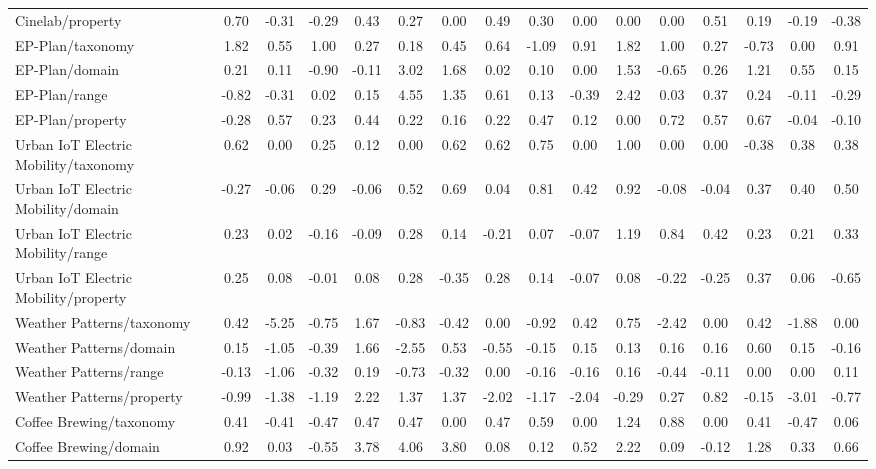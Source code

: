 \begin{tabular}{lccccccccccccccc}
Cinelab/property & 0.70 & -0.31 & -0.29 & 0.43 & 0.27 & 0.00 & 0.49 & 0.30 & 0.00 & 0.00 & 0.00 & 0.51 & 0.19 & -0.19 & -0.38 \\
EP-Plan/taxonomy & 1.82 & 0.55 & 1.00 & 0.27 & 0.18 & 0.45 & 0.64 & -1.09 & 0.91 & 1.82 & 1.00 & 0.27 & -0.73 & 0.00 & 0.91 \\
EP-Plan/domain & 0.21 & 0.11 & -0.90 & -0.11 & 3.02 & 1.68 & 0.02 & 0.10 & 0.00 & 1.53 & -0.65 & 0.26 & 1.21 & 0.55 & 0.15 \\
EP-Plan/range & -0.82 & -0.31 & 0.02 & 0.15 & 4.55 & 1.35 & 0.61 & 0.13 & -0.39 & 2.42 & 0.03 & 0.37 & 0.24 & -0.11 & -0.29 \\
EP-Plan/property & -0.28 & 0.57 & 0.23 & 0.44 & 0.22 & 0.16 & 0.22 & 0.47 & 0.12 & 0.00 & 0.72 & 0.57 & 0.67 & -0.04 & -0.10 \\
Urban IoT Electric Mobility/taxonomy & 0.62 & 0.00 & 0.25 & 0.12 & 0.00 & 0.62 & 0.62 & 0.75 & 0.00 & 1.00 & 0.00 & 0.00 & -0.38 & 0.38 & 0.38 \\
Urban IoT Electric Mobility/domain & -0.27 & -0.06 & 0.29 & -0.06 & 0.52 & 0.69 & 0.04 & 0.81 & 0.42 & 0.92 & -0.08 & -0.04 & 0.37 & 0.40 & 0.50 \\
Urban IoT Electric Mobility/range & 0.23 & 0.02 & -0.16 & -0.09 & 0.28 & 0.14 & -0.21 & 0.07 & -0.07 & 1.19 & 0.84 & 0.42 & 0.23 & 0.21 & 0.33 \\
Urban IoT Electric Mobility/property & 0.25 & 0.08 & -0.01 & 0.08 & 0.28 & -0.35 & 0.28 & 0.14 & -0.07 & 0.08 & -0.22 & -0.25 & 0.37 & 0.06 & -0.65 \\
Weather Patterns/taxonomy & 0.42 & -5.25 & -0.75 & 1.67 & -0.83 & -0.42 & 0.00 & -0.92 & 0.42 & 0.75 & -2.42 & 0.00 & 0.42 & -1.88 & 0.00 \\
Weather Patterns/domain & 0.15 & -1.05 & -0.39 & 1.66 & -2.55 & 0.53 & -0.55 & -0.15 & 0.15 & 0.13 & 0.16 & 0.16 & 0.60 & 0.15 & -0.16 \\
Weather Patterns/range & -0.13 & -1.06 & -0.32 & 0.19 & -0.73 & -0.32 & 0.00 & -0.16 & -0.16 & 0.16 & -0.44 & -0.11 & 0.00 & 0.00 & 0.11 \\
Weather Patterns/property & -0.99 & -1.38 & -1.19 & 2.22 & 1.37 & 1.37 & -2.02 & -1.17 & -2.04 & -0.29 & 0.27 & 0.82 & -0.15 & -3.01 & -0.77 \\
Coffee Brewing/taxonomy & 0.41 & -0.41 & -0.47 & 0.47 & 0.47 & 0.00 & 0.47 & 0.59 & 0.00 & 1.24 & 0.88 & 0.00 & 0.41 & -0.47 & 0.06 \\
Coffee Brewing/domain & 0.92 & 0.03 & -0.55 & 3.78 & 4.06 & 3.80 & 0.08 & 0.12 & 0.52 & 2.22 & 0.09 & -0.12 & 1.28 & 0.33 & 0.66 \\

\end{tabular}

